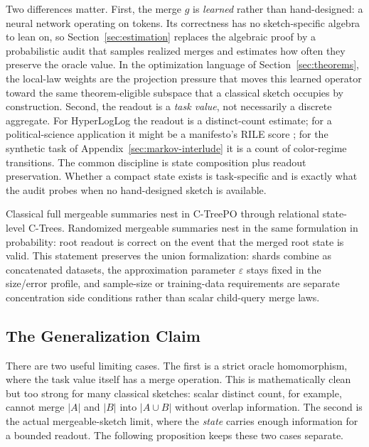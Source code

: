 Two differences matter. First, the merge $g$ is \emph{learned} rather than
hand-designed: a neural network operating on tokens. Its correctness has no
sketch-specific algebra to lean on, so Section~\ref{sec:estimation} replaces the
algebraic proof by a probabilistic audit that samples realized merges and
estimates how often they preserve the oracle value. In the optimization
language of Section~\ref{sec:theorems}, the local-law weights are the
projection pressure that moves this learned operator toward the same
theorem-eligible subspace that a classical sketch occupies by construction.
Second, the readout is a \emph{task value}, not necessarily a discrete
aggregate. For HyperLogLog the readout is a distinct-count estimate; for a
political-science application it might be a manifesto's RILE score
\citep{BenoitEtAl2025,ManifestoProject2025a}; for the synthetic task of
Appendix~\ref{sec:markov-interlude} it is a count of color-regime transitions.
The common discipline is state composition plus readout preservation. Whether
a compact state exists is task-specific and is exactly what the audit probes
when no hand-designed sketch is available.

Classical full mergeable summaries nest in C-TreePO through relational
state-level C-Trees. Randomized mergeable summaries nest in the same
formulation in probability: root readout is correct on the event that the
merged root state is valid. This statement preserves the union
formalization: shards combine as concatenated datasets, the approximation
parameter $\varepsilon$ stays fixed in the size/error profile, and
sample-size or training-data requirements are separate concentration
side conditions rather than scalar child-query merge laws.

\subsection{The Generalization Claim}

There are two useful limiting cases. The first is a strict oracle
homomorphism, where the task value itself has a merge operation. This is
mathematically clean but too strong for many classical sketches: scalar
distinct count, for example, cannot merge $|A|$ and $|B|$ into $|A\cup B|$
without overlap information. The second is the actual mergeable-sketch limit,
where the \emph{state} carries enough information for a bounded readout. The
following proposition keeps these two cases separate.

